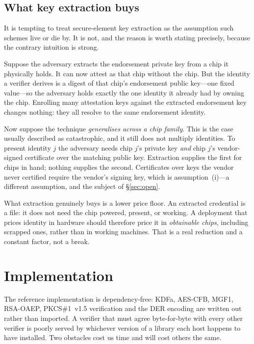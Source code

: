 \documentclass[conference,10pt]{IEEEtran}
\begin{document}
\subsection{What key extraction buys}
\label{sec:extraction}

It is tempting to treat secure-element key extraction as the assumption such schemes live or die by. It
is not, and the reason is worth stating precisely, because the contrary intuition is strong.

Suppose the adversary extracts the endorsement private key from a chip it physically holds. It can now
attest as that chip without the chip. But the identity a verifier derives is a digest of that chip's
endorsement public key---one fixed value---so the adversary holds exactly the one identity it already
had by owning the chip. Enrolling many attestation keys against the extracted endorsement key changes
nothing: they all resolve to the same endorsement identity.

Now suppose the technique \emph{generalises across a chip family}. This is the case usually described as
catastrophic, and it still does not multiply identities. To present identity $j$ the adversary needs
chip $j$'s private key \emph{and} chip $j$'s vendor-signed certificate over the matching public key.
Extraction supplies the first for chips in hand; nothing supplies the second. Certificates over keys the
vendor never certified require the vendor's signing key, which is assumption~(i)---a different
assumption, and the subject of \S\ref{sec:open}.

What extraction genuinely buys is a lower price floor. An extracted credential is a file: it does not
need the chip powered, present, or working. A deployment that prices identity in hardware should
therefore price it in \emph{obtainable chips}, including scrapped ones, rather than in working machines.
That is a real reduction and a constant factor, not a break.

\section{Implementation}
\label{sec:impl}

The reference implementation is dependency-free: KDFa, AES-CFB, MGF1, RSA-OAEP, PKCS\#1~v1.5
verification and the DER encoding are written out rather than imported. A verifier that must agree
byte-for-byte with every other verifier is poorly served by whichever version of a library each host
happens to have installed. Two obstacles cost us time and will cost others the same.
\end{document}
